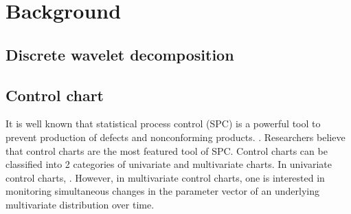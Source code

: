 \chapter{Background}
\label{cp:Background}

\section{Discrete wavelet decomposition}


\section{Control chart}

It is well known that statistical process control (SPC) is a
powerful tool to prevent production of defects and
nonconforming products. . Researchers believe that control charts are the
most featured tool of SPC. Control charts can be classified
into 2 categories of univariate and multivariate charts. In
univariate control charts, . However, in multivariate control charts, one is
interested in monitoring simultaneous changes in the parameter
vector of an underlying multivariate distribution over time.



